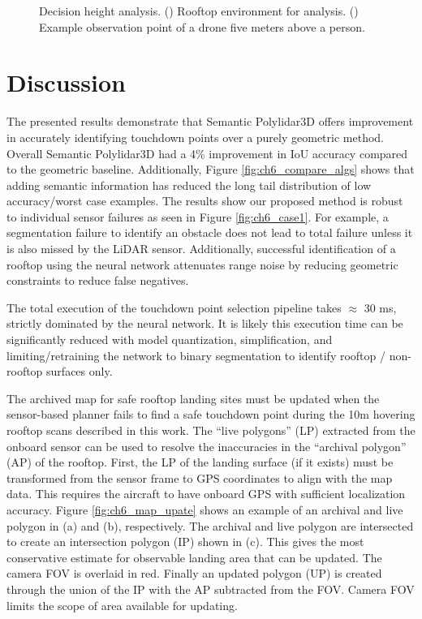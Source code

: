 \begin{figure}[ht]
\begin{subfigure}{.35\linewidth}
    \caption{\label{fig:ch6_dp_b}}
  \end{subfigure}
  \caption[Decision height analysis]{Decision height analysis. () Rooftop environment for analysis.   () Example observation point of a drone five meters above a person.}\label{fig:ch6_dp}
\end{figure}

\section{Discussion}\label{sec:ch6_discussion}

The presented results demonstrate that Semantic Polylidar3D offers improvement in accurately identifying touchdown points over a purely geometric method. Overall Semantic Polylidar3D had a 4\% improvement in IoU accuracy compared to the geometric baseline. Additionally, Figure \ref{fig:ch6_compare_algs} shows that adding semantic information has reduced the long tail distribution of low accuracy/worst case examples. The results show our proposed method is robust to individual sensor failures as seen in Figure \ref{fig:ch6_case1}. For example, a segmentation failure to identify an obstacle does not lead to total failure unless it is also missed by the LiDAR sensor. Additionally, successful identification of a rooftop using the neural network attenuates range noise by reducing geometric constraints to reduce false negatives.

The total execution of the touchdown point selection pipeline takes $\approx$ 30 ms, strictly dominated by the neural network. It is likely this execution time can be significantly reduced with model quantization, simplification, and limiting/retraining the network to binary segmentation to identify rooftop / non-rooftop surfaces only.

The archived map for safe rooftop landing sites must be updated when the sensor-based planner fails to find a safe touchdown point during the 10m hovering rooftop scans described in this work.  The ``live polygons'' (LP) extracted from the onboard sensor can be used to resolve the inaccuracies in the ``archival polygon'' (AP) of the rooftop. First, the LP of the landing surface (if it exists) must be transformed from the sensor frame to GPS coordinates to align with the map data. This requires the aircraft to have onboard GPS with sufficient localization accuracy.  Figure \ref{fig:ch6_map_upate} shows an example of an archival and live polygon in (a) and (b), respectively. The archival and live polygon are intersected to create an intersection polygon (IP) shown in (c). This gives the most conservative estimate for observable landing area that can be updated. The camera FOV is overlaid in red. Finally an updated polygon (UP) is created through the union of the IP with the AP subtracted from the FOV. Camera FOV limits the scope of area available for updating. 


